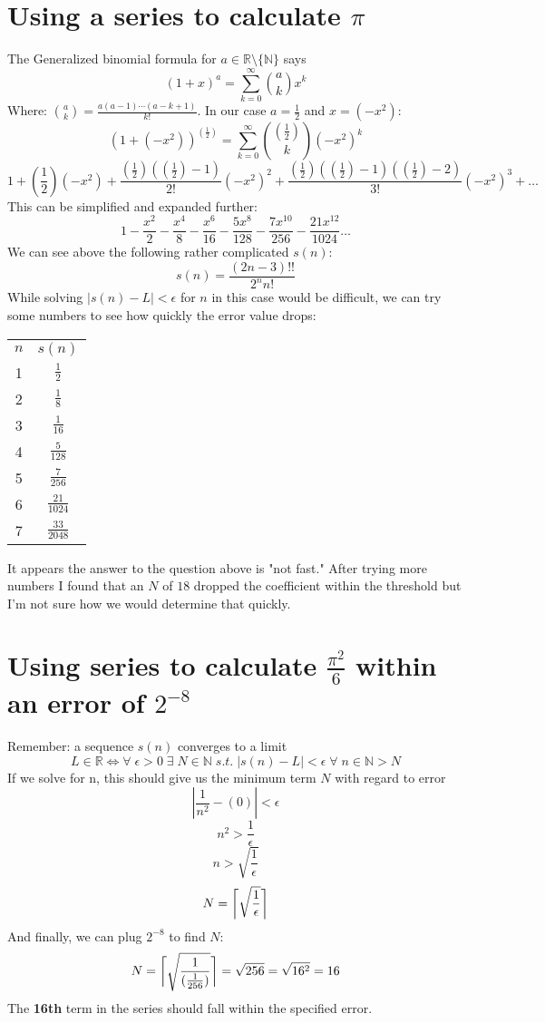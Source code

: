 \documentclass{article}
\DeclarePairedDelimiter{\ceil}{\lceil}{\rceil}
\begin{document}
\section{Using a series to calculate $\pi$}
    The Generalized binomial formula for $a\in \mathbb R\setminus \{\mathbb N\}$ says
    \[(1+x)^a= \sum_{k=0}^{\infty}{a\choose k} x^k\]
    Where: ${{a\choose k} =\frac{a(a-1)\cdots(a-k+1)}{k!}}$. In our case $a=\frac{1}{2}$ and $x=(-x^2)$:
    \[(1+(-x^2))^{(\frac{1}{2})}= \sum_{k=0}^{\infty}{(\frac{1}{2})\choose k} (-x^2)^k\]
    \[1+\left(\frac{1}{2}\right)\left(-x^2\right)+\frac{\left(\frac{1}{2}\right)\left(\left(\frac{1}{2}\right)-1\right)}{2!}\left(-x^2\right)^2+\frac{\left(\frac{1}{2}\right)\left(\left(\frac{1}{2}\right)-1\right)\left(\left(\frac{1}{2}\right)-2\right)}{3!}\left(-x^2\right)^3+\dots\]
    This can be simplified and expanded further:
    \[1-\frac{x^2}{2}-\frac{x^4}{8}-\frac{x^6}{16}-\frac{5x^8}{128}-\frac{7x^{10}}{256}-\frac{21x^{12}}{1024}\dots\]
    We can see above the following rather complicated $s(n)$:
    \[s(n) = \frac{\left(2n-3\right)!!}{2^nn!}\]
    While solving $\left|s(n) - L\right| < \epsilon$ for $n$ in this case would be difficult, we can try some numbers to see how quickly the error value drops:
    \begin{center}
     \begin{tabular}{|| c | c ||}
     \hline
     $n$ & $s(n)$ \\ [0.5ex]
     1 & $\frac{1}{2}$ \\
     2 & $\frac{1}{8}$ \\
     3 & $\frac{1}{16}$ \\
     4 & $\frac{5}{128}$ \\
     5 & $\frac{7}{256}$ \\
     6 & $\frac{21}{1024}$ \\
     7 & $\frac{33}{2048}$ \\
     [1ex]
     \hline
    \end{tabular}
    \end{center}
    It appears the answer to the question above is "not fast." After trying more numbers I found that an $N$ of $18$ dropped the coefficient within the threshold but I'm not sure how we would determine that quickly.

\section{Using series to calculate $\frac{\pi^2}{6}$ within an error of $2^{-8}$}
    Remember: a sequence $s(n)$ converges to a limit
    \[L \in\mathbb{R}\iff\forall \; \epsilon > 0  \; \exists \; N \in \mathbb{N} \; s.t. \; |s(n) - L| < \epsilon \; \forall \; n \in \mathbb{N} > N\]
    If we solve for n, this should give us the minimum term $N$ with regard to error %
    \[ |\frac{1}{n^2} - (0)| < \epsilon\]
    \[n^2>\frac{1}{\epsilon}\]
    \[n>\sqrt{\frac{1}{\epsilon}}\]
    \[N=\ceil[\bigg]{\sqrt{\frac{1}{\epsilon}}}\]
    And finally, we can plug $2^{-8}$ to find $N$:
    \[N=\ceil[\bigg]{\sqrt{\frac{1}{(\frac{1}{256})}}}=\sqrt{256}=\sqrt{16^2}=16\]
    The \textbf{16th} term in the series should fall within the specified error.
\end{document}
